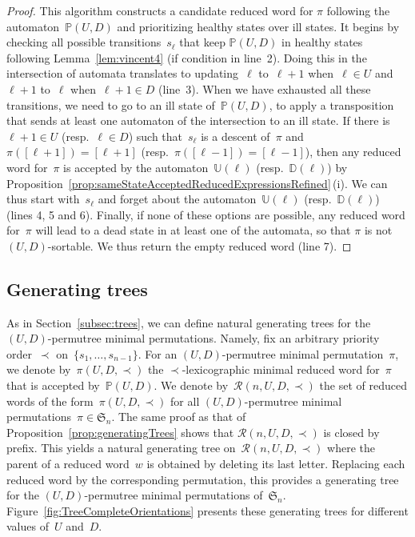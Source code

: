 \documentclass[ALCO]{cedram}
\newcommand{\fS}{\mathfrak{S}}
\newcommand{\automatonP}{\mathbb{P}}
\newcommand{\automatonU}{\mathbb{U}}
\newcommand{\automatonD}{\mathbb{D}}
\newcommand{\lexmin}{\mathcal{R}}
\begin{document}
\begin{proof}
This algorithm constructs a candidate reduced word for $\pi$ following the automaton~$\automatonP(U,D)$ and prioritizing healthy states over ill states. 
It begins by checking all possible transitions~$s_\ell$ that keep $\automatonP(U,D)$ in healthy states following Lemma~\ref{lem:vincent4} (if condition in line~2).
Doing this in the intersection of automata translates to updating~$\ell$ to~$\ell+1$ when~$\ell \in U$ and $\ell+1$ to~$\ell$ when~$\ell+1 \in D$ (line~3).
When we have exhausted all these transitions, we need to go to an ill state of~$\automatonP(U,D)$, \ie to apply a transposition that sends at least one automaton of the intersection to an ill state.
If there is~$\ell+1 \in U$ (resp.~$\ell \in D$) such that~$s_\ell$ is a descent of~$\pi$ and~$\pi([\ell+1]) = [\ell+1]$ (resp.~$\pi([\ell-1]) = [\ell-1]$), then any reduced word for~$\pi$ is accepted by the automaton~$\automatonU(\ell)$ (resp.~$\automatonD(\ell)$) by Proposition~\ref{prop:sameStateAcceptedReducedExpressionsRefined}\,(i). 
We can thus start with~$s_\ell$ and forget about the automaton~$\automatonU(\ell)$ (resp.~$\automatonD(\ell)$) (lines 4, 5 and 6).
Finally, if none of these options are possible, any reduced word for~$\pi$ will lead to a dead state in at least one of the automata, so that $\pi$ is not $(U,D)$-sortable.
We thus return the empty reduced word (line 7).
\end{proof}

\subsection{Generating trees}

As in Section~\ref{subsec:trees}, we can define natural generating trees for the $(U,D)$-permutree minimal permutations.
Namely, fix an arbitrary priority order~$\prec$ on~$\{s_1, \dots, s_{n-1}\}$.
For an $(U,D)$-permutree minimal permutation~$\pi$, we denote by~$\pi(U, D, \prec)$ the $\prec$-lexicographic minimal reduced word for~$\pi$ that is accepted by~$\automatonP(U,D)$.
We denote by~$\lexmin(n, U, D, \prec)$ the set of reduced words of the form~$\pi(U, D, \prec)$ for all $(U,D)$-permutree minimal permutations~$\pi \in \fS_n$.
The same proof as that of Proposition~\ref{prop:generatingTrees} shows that $\lexmin(n, U, D, \prec)$ is closed by prefix.
This yields a natural generating tree on~$\lexmin(n, U, D, \prec)$ where the parent of a reduced word~$w$ is obtained by deleting its last letter.
Replacing each reduced word by the corresponding permutation, this provides a generating tree for the $(U,D)$-permutree minimal permutations of~$\fS_n$.
Figure~\ref{fig:TreeCompleteOrientations} presents these generating trees for different values of~$U$ and~$D$.
\end{document}
